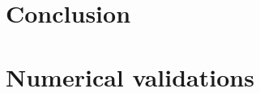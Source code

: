 \documentclass[11pt]{My_preprint}
\begin{document}
% 

\section{Conclusion}


\appendix
\section{Numerical validations}
\label{ap:validation}

% 




\end{document}
